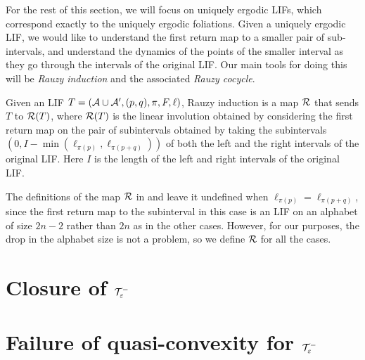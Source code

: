 \documentclass[12pt, reqno]{amsart}
\begin{document}
For the rest of this section, we will focus on uniquely ergodic LIFs, which correspond exactly to the uniquely ergodic foliations.
Given a uniquely ergodic LIF, we would like to understand the first return map to a smaller pair of sub-intervals, and understand the dynamics of the points of the smaller interval as they go through the intervals of the original LIF.
Our main tools for doing this will be \emph{Rauzy induction} and the associated \emph{Rauzy cocycle}.
\begin{definition}
  Given an LIF $T = (\mathcal{A} \cup \mathcal{A}^{\prime}, (p,q), \pi, F, \ell)$, Rauzy induction is a map $\mathcal{R}$ that sends $T$ to $\mathcal{R}(T)$, where $\mathcal{R}(T)$ is the linear involution obtained by considering the first return map on the pair of subintervals obtained by taking the subintervals $(0, I - \min(\ell_{\pi(p)}, \ell_{\pi(p+q)}))$ of both the left and the right intervals of the original LIF. Here $I$ is the length of the left and right intervals of the original LIF.
\end{definition}
\begin{remark}
  The definitions of the map $\mathcal{R}$ in \cite{ASENS_1990_4_23_3_469_0} and \cite{boissy2009dynamics} leave it undefined when $\ell_{\pi(p)} = \ell_{\pi(p+q)}$, since the first return map to the subinterval in this case is an LIF on an alphabet of size $2n-2$ rather than $2n$ as in the other cases.
  However, for our purposes, the drop in the alphabet size is not a problem, so we define $\mathcal{R}$ for all the cases.
\end{remark}

\section{Closure of $\mathcal{T}_{\varepsilon}^{-}$}
\label{sec:closure-systole}

\section{Failure of quasi-convexity for $\mathcal{T}_{\varepsilon}^{-}$}
\label{sec:fail-quasi-conv}



\printbibliography
\end{document}
